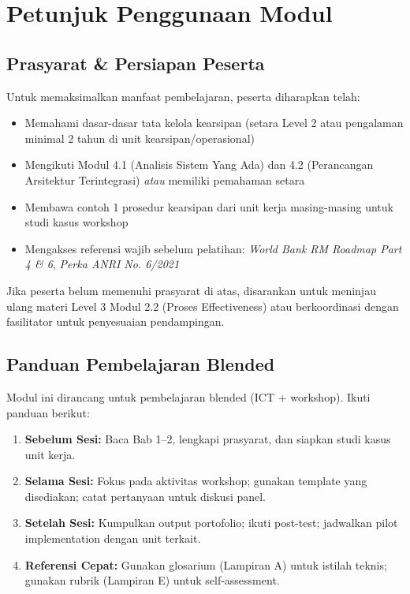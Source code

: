 \documentclass[12pt,a4paper]{report}
\begin{document}
\chapter*{Petunjuk Penggunaan Modul}

\section*{Prasyarat \& Persiapan Peserta}
Untuk memaksimalkan manfaat pembelajaran, peserta diharapkan telah:
\begin{itemize}[leftmargin=*]
    \item Memahami dasar-dasar tata kelola kearsipan (setara Level 2 atau pengalaman minimal 2 tahun di unit kearsipan/operasional)
    \item Mengikuti Modul 4.1 (Analisis Sistem Yang Ada) dan 4.2 (Perancangan Arsitektur Terintegrasi) \textit{atau} memiliki pemahaman setara
    \item Membawa contoh 1 prosedur kearsipan dari unit kerja masing-masing untuk studi kasus workshop
    \item Mengakses referensi wajib sebelum pelatihan: \textit{World Bank RM Roadmap Part 4 \& 6}, \textit{Perka ANRI No. 6/2021}
\end{itemize}

\begin{warnbox}
Jika peserta belum memenuhi prasyarat di atas, disarankan untuk meninjau ulang materi Level 3 Modul 2.2 (Proses Effectiveness) atau berkoordinasi dengan fasilitator untuk penyesuaian pendampingan.
\end{warnbox}

\section*{Panduan Pembelajaran Blended}
Modul ini dirancang untuk pembelajaran blended (ICT + workshop). Ikuti panduan berikut:

\begin{enumerate}[leftmargin=*]
    \item \textbf{Sebelum Sesi:} Baca Bab 1--2, lengkapi prasyarat, dan siapkan studi kasus unit kerja.
    \item \textbf{Selama Sesi:} Fokus pada aktivitas workshop; gunakan template yang disediakan; catat pertanyaan untuk diskusi panel.
    \item \textbf{Setelah Sesi:} Kumpulkan output portofolio; ikuti post-test; jadwalkan pilot implementation dengan unit terkait.
    \item \textbf{Referensi Cepat:} Gunakan glosarium (Lampiran A) untuk istilah teknis; gunakan rubrik (Lampiran E) untuk self-assessment.
\end{enumerate}
\end{document}
